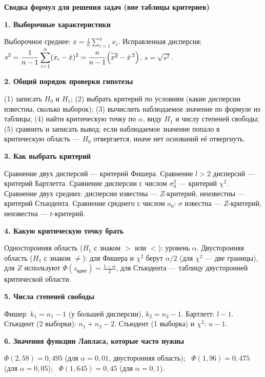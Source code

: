 \documentclass[a4paper,landscape,9pt]{extarticle}
\newcommand{\kr}{\text{крит}}
\begin{document}
\newpage
\normalsize
\begin{center}{\large\bfseries Сводка формул для решения задач (вне таблицы критериев)}\end{center}
\vspace{2pt}
\textbf{1. Выборочные характеристики}\par\smallskip
Выборочное среднее: $\displaystyle \bar x=\frac1n\sum_{i=1}^n x_i$.\qquad
Исправленная дисперсия: $\displaystyle s^2=\frac1{n-1}\sum_{i=1}^n (x_i-\bar x)^2=\frac{n}{n-1}\Bigl(\overline{x^2}-\bar x^{\,2}\Bigr)$.\qquad
$s=\sqrt{s^2}$.\par\bigskip
\textbf{2. Общий порядок проверки гипотезы}\par\smallskip
(1) записать $H_0$ и $H_1$; (2) выбрать критерий по условиям (какие дисперсии известны, сколько выборок); (3) вычислить наблюдаемое значение по формуле из таблицы; (4) найти критическую точку по $\alpha$, виду $H_1$ и числу степеней свободы; (5) сравнить и записать вывод: если наблюдаемое значение попало в критическую область --- $H_0$ отвергается, иначе нет оснований её отвергнуть.\par\bigskip
\textbf{3. Как выбрать критерий}\par\smallskip
Сравнение двух дисперсий --- критерий Фишера. Сравнение $l>2$ дисперсий --- критерий Бартлетта. Сравнение дисперсии с числом $\sigma_0^2$ --- критерий $\chi^2$.
Сравнение двух средних: дисперсии известны --- $Z$-критерий, неизвестны --- критерий Стьюдента. Сравнение среднего с числом $a_0$: $\sigma$ известна --- $Z$-критерий, неизвестна --- $t$-критерий.\par\bigskip
\textbf{4. Какую критическую точку брать}\par\smallskip
Односторонняя область ($H_1$ с знаком $>$ или $<$): уровень $\alpha$. Двусторонняя область ($H_1$ с знаком $\ne$): для Фишера и $\chi^2$ берут $\alpha/2$ (для $\chi^2$ --- две границы), для $Z$ используют $\Phi(z_{\kr})=\frac{1-\alpha}2$, для Стьюдента --- таблицу двусторонней критической области.\par\bigskip
\textbf{5. Числа степеней свободы}\par\smallskip
Фишер: $k_1=n_1-1$ (у большей дисперсии), $k_2=n_2-1$. Бартлетт: $l-1$. Стьюдент (2 выборки): $n_1+n_2-2$. Стьюдент (1 выборка) и $\chi^2$: $n-1$.\par\bigskip
\textbf{6. Значения функции Лапласа, которые часто нужны}\par\smallskip
$\Phi(2{,}58)=0{,}495$ (для $\alpha=0{,}01$, двусторонняя область); \ $\Phi(1{,}96)=0{,}475$ (для $\alpha=0{,}05$); \ $\Phi(1{,}645)=0{,}45$ (для $\alpha=0{,}1$).
\end{document}
